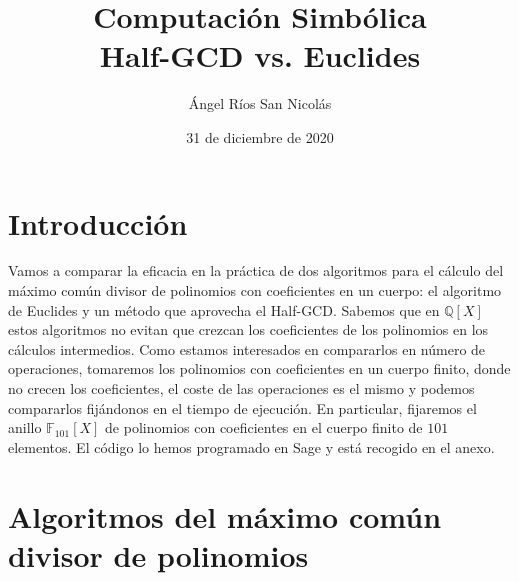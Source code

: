 \documentclass[10pt]{article}
\title{Computación Simbólica\\ \large Half-GCD vs. Euclides}
\author{Ángel Ríos San Nicolás}
\date{31 de diciembre de 2020}
\theoremstyle{definition}
\begin{document}
\maketitle
%
\section{Introducción}
 Vamos a comparar la eficacia en la práctica de dos algoritmos para el cálculo del máximo común divisor de polinomios con coeficientes en un cuerpo: el algoritmo de Euclides y un método que aprovecha el Half-GCD. Sabemos que en $\mathbb{Q}[X]$ estos algoritmos no evitan que crezcan los coeficientes de los polinomios en los cálculos intermedios. Como estamos interesados en compararlos en número de operaciones, tomaremos los polinomios con coeficientes en un cuerpo finito, donde no crecen los coeficientes, el coste de las operaciones es el mismo y podemos compararlos fijándonos en el tiempo de ejecución. En particular, fijaremos el anillo $\mathbb{F}_{101}[X]$ de polinomios con coeficientes en el cuerpo finito de $101$ elementos. El código lo hemos programado en Sage y está recogido en el anexo.

\section{Algoritmos del máximo común divisor de polinomios}
\end{document}
